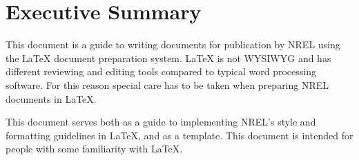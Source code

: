 \chapter*{Executive Summary}
This document is a guide to writing documents for publication by NREL using the LaTeX document preparation system. LaTeX is not WYSIWYG and has different reviewing and editing tools compared to typical word processing software. For this reason special care has to be taken when preparing NREL documents in LaTeX. 

This document serves both as a guide to implementing NREL's style and formatting guidelines in LaTeX, and as a template. This document is intended for people with some familiarity with LaTeX.